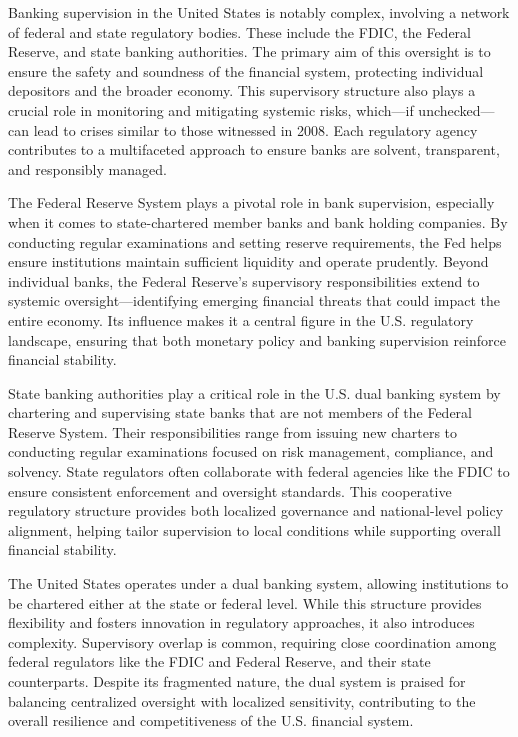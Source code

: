 Banking supervision in the United States is notably complex, involving a network of federal and state regulatory bodies. These include the FDIC, the Federal Reserve, and state banking authorities. The primary aim of this oversight is to ensure the safety and soundness of the financial system, protecting individual depositors and the broader economy. This supervisory structure also plays a crucial role in monitoring and mitigating systemic risks, which—if unchecked—can lead to crises similar to those witnessed in 2008. Each regulatory agency contributes to a multifaceted approach to ensure banks are solvent, transparent, and responsibly managed.

The Federal Reserve System plays a pivotal role in bank supervision, especially when it comes to state-chartered member banks and bank holding companies. By conducting regular examinations and setting reserve requirements, the Fed helps ensure institutions maintain sufficient liquidity and operate prudently. Beyond individual banks, the Federal Reserve's supervisory responsibilities extend to systemic oversight—identifying emerging financial threats that could impact the entire economy. Its influence makes it a central figure in the U.S. regulatory landscape, ensuring that both monetary policy and banking supervision reinforce financial stability.

State banking authorities play a critical role in the U.S. dual banking system by chartering and supervising state banks that are not members of the Federal Reserve System. Their responsibilities range from issuing new charters to conducting regular examinations focused on risk management, compliance, and solvency. State regulators often collaborate with federal agencies like the FDIC to ensure consistent enforcement and oversight standards. This cooperative regulatory structure provides both localized governance and national-level policy alignment, helping tailor supervision to local conditions while supporting overall financial stability.

The United States operates under a dual banking system, allowing institutions to be chartered either at the state or federal level. While this structure provides flexibility and fosters innovation in regulatory approaches, it also introduces complexity. Supervisory overlap is common, requiring close coordination among federal regulators like the FDIC and Federal Reserve, and their state counterparts. Despite its fragmented nature, the dual system is praised for balancing centralized oversight with localized sensitivity, contributing to the overall resilience and competitiveness of the U.S. financial system.

